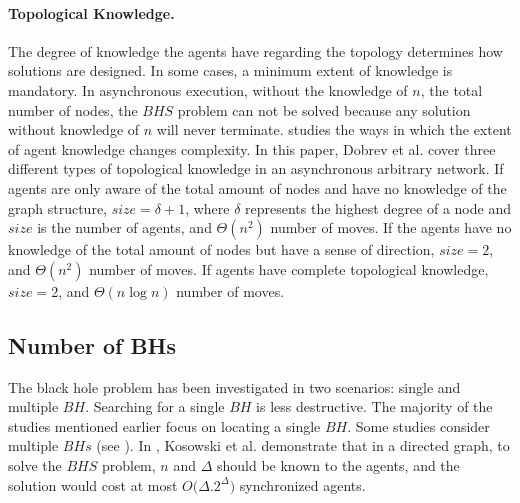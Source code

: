 \paragraph{Topological Knowledge.}
The degree of knowledge the agents have regarding the topology determines how solutions are designed. In some cases, a minimum extent of knowledge is mandatory. In asynchronous execution, without the knowledge of $n$, the total number of nodes, the $BHS$ problem can not be solved because any solution without knowledge of $n$ will never terminate. \cite{dobetal7} studies the ways in which the extent of agent knowledge changes complexity. In this paper, Dobrev et al. cover three different types of topological knowledge in an asynchronous arbitrary network.  If agents are only aware of the total amount of nodes and have no knowledge of the graph structure, $size=\delta+1$, where $\delta$ represents the highest degree of a node and $size$ is the number of agents, and $\Theta(n^2)$ number of moves. If the agents have no knowledge of the total amount of nodes but have a sense of direction, 
  $size=2$, and $\Theta(n^2)$ number of moves. If agents have complete topological knowledge, $size=2$, and $\Theta(n\log n)$ number of moves. 



\subsection{Number of BHs}
The black hole problem has been investigated in two scenarios: single and multiple $BH$. Searching for a single $BH$ is less destructive. The majority of the studies mentioned earlier focus on locating a single $BH$. Some studies consider multiple $BHs$  (see \cite{kosetal16,floetal11}). In \cite{kosetal16}, Kosowski et al. demonstrate that in a  directed graph, to solve the $BHS$ problem, $n$ and $\Delta$ should be known to the agents, and the solution would cost at most $O(\Delta$.$ 2^{\Delta})$ synchronized agents.







